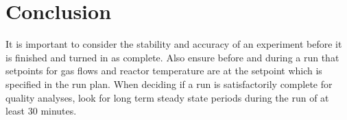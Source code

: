 \documentclass[11pt]{article}
\begin{document}
\section*{Conclusion}

It is important to consider the stability and accuracy of an experiment before it is finished and turned in as complete.  Also ensure before and during a run that setpoints for gas flows and reactor temperature are at the setpoint which is specified in the run plan.  When deciding if a run is satisfactorily complete for quality analyses, look for long term steady state periods during the run of at least 30 minutes.
\end{document}
